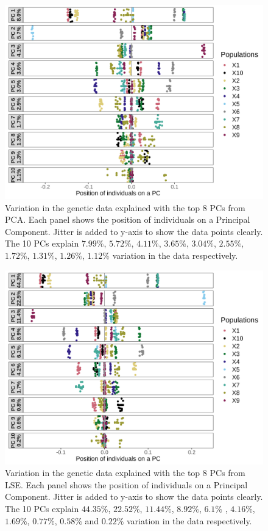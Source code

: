 \documentclass[12pt, letterpaper]{article}
\begin{document}
\begin{figure}[ht!]
    \includegraphics[width=16.5cm]{plots/supplementary/pcaplot2.png}
    \centering
    \caption{Variation in the genetic data explained with the top 8 PCs from PCA. Each panel shows the position of individuals on a Principal Component. Jitter is added to y-axis to show the data points clearly. The 10 PCs explain $7.99\%$, $5.72\%$, $4.11\%$, $3.65\%$, $3.04\%$, $2.55\%$, $1.72\%$, $1.31\%$, $1.26\%$, $1.12\%$ variation in the data respectively.}
    \label{figS1:pc_scale}
\end{figure}

\begin{figure}[ht!]
    \includegraphics[width=16.5cm]{plots/supplementary/lseplot2.png}
    \centering
    \caption{Variation in the genetic data explained with the top 8 PCs from LSE. Each panel shows the position of individuals on a Principal Component. Jitter is added to y-axis to show the data points clearly. The 10 PCs explain $44.35\%$, $22.52\%$, $11.44\%$,  $8.92\%$,  $6.1\%$ ,  $4.16\%$,  $1.69\%$,  $0.77\%$,  $0.58\%$ and $0.22\%$ variation in the data respectively.}
    \label{figS1:pc_scale}
\end{figure}
\end{document}
